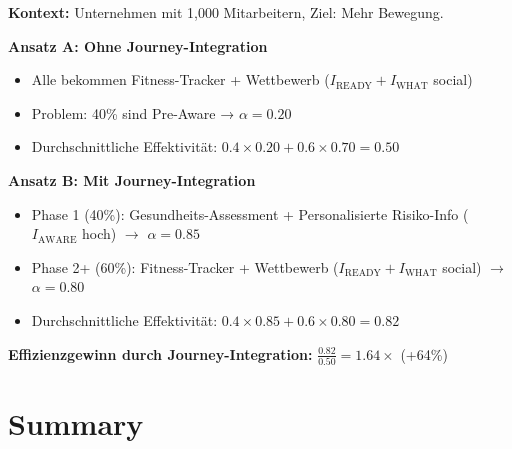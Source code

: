 \textbf{Kontext:} Unternehmen mit 1,000 Mitarbeitern, Ziel: Mehr Bewegung.

\textbf{Ansatz A: Ohne Journey-Integration}
\begin{itemize}
\item Alle bekommen Fitness-Tracker + Wettbewerb ($I_{\text{READY}} + I_{\text{WHAT}}$ social)
\item Problem: 40\% sind Pre-Aware → $\alpha = 0.20$
\item Durchschnittliche Effektivität: $0.4 \times 0.20 + 0.6 \times 0.70 = 0.50$
\end{itemize}

\textbf{Ansatz B: Mit Journey-Integration}
\begin{itemize}
\item Phase 1 (40\%): Gesundheits-Assessment + Personalisierte Risiko-Info ($I_{\text{AWARE}}$ hoch) $\rightarrow$ $\alpha = 0.85$
\item Phase 2+ (60\%): Fitness-Tracker + Wettbewerb ($I_{\text{READY}} + I_{\text{WHAT}}$ social) $\rightarrow$ $\alpha = 0.80$
\item Durchschnittliche Effektivität: $0.4 \times 0.85 + 0.6 \times 0.80 = 0.82$
\end{itemize}

\textbf{Effizienzgewinn durch Journey-Integration:} $\frac{0.82}{0.50} = 1.64\times$ (+64\%)


\section{Summary}
\label{sec:18-summary}

